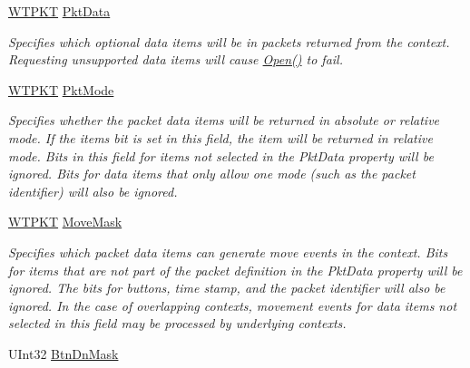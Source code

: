 \begin{DoxyCompactItemize}
\mbox{\hyperlink{class_wintab_d_n_1_1_w_t_p_k_t}{W\+T\+P\+KT}} \mbox{\hyperlink{class_wintab_d_n_1_1_c_wintab_context_a3da21ad3b21239b8463f54a83f7f1bb8}{Pkt\+Data}}
\begin{DoxyCompactList}\small\item\em Specifies which optional data items will be in packets returned from the context. Requesting unsupported data items will cause \mbox{\hyperlink{class_wintab_d_n_1_1_c_wintab_context_a1522d857d00373971e9c0e010ae9e756}{Open()}} to fail. \end{DoxyCompactList}\item 
\mbox{\hyperlink{class_wintab_d_n_1_1_w_t_p_k_t}{W\+T\+P\+KT}} \mbox{\hyperlink{class_wintab_d_n_1_1_c_wintab_context_a05489816378ed5052a3e0e6a8a517d7b}{Pkt\+Mode}}
\begin{DoxyCompactList}\small\item\em Specifies whether the packet data items will be returned in absolute or relative mode. If the item\textquotesingle{}s bit is set in this field, the item will be returned in relative mode. Bits in this field for items not selected in the Pkt\+Data property will be ignored. Bits for data items that only allow one mode (such as the packet identifier) will also be ignored. ~\newline
\end{DoxyCompactList}\item 
\mbox{\hyperlink{class_wintab_d_n_1_1_w_t_p_k_t}{W\+T\+P\+KT}} \mbox{\hyperlink{class_wintab_d_n_1_1_c_wintab_context_a76772f28304fd4f8e4c511e7b65bdd59}{Move\+Mask}}
\begin{DoxyCompactList}\small\item\em Specifies which packet data items can generate move events in the context. Bits for items that are not part of the packet definition in the Pkt\+Data property will be ignored. The bits for buttons, time stamp, and the packet identifier will also be ignored. In the case of overlapping contexts, movement events for data items not selected in this field may be processed by underlying contexts. \end{DoxyCompactList}\item 
U\+Int32 \mbox{\hyperlink{class_wintab_d_n_1_1_c_wintab_context_a972a0b1d0634fc580aa65b8943af3905}{Btn\+Dn\+Mask}}

\end{DoxyCompactItemize}
